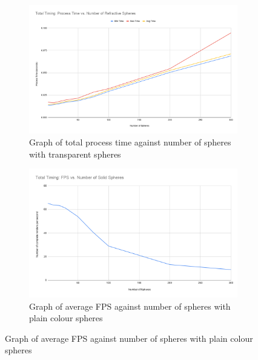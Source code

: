 \documentclass[final]{cmpreport}
\begin{document}
\begin{figure}
    \centering
    \begin{subfigure}{0.5\textwidth}
        \centering
        \includegraphics[width=\linewidth]{img/Total Timing Process Time vs. Number of Refractive Spheres.png}
        \caption{Graph of total process time against number of spheres with transparent spheres}
        \label{graphglassspheretotal}
    \end{subfigure}%
    \begin{subfigure}{0.5\textwidth}
        \centering
        \includegraphics[width=\linewidth]{img/Total Timing FPS vs. Number of Solid Spheres.png}
        \caption{Graph of average FPS against number of spheres with plain colour spheres}
        \label{graphsolidspherefps}
    \end{subfigure}
\end{figure}
\end{document}
